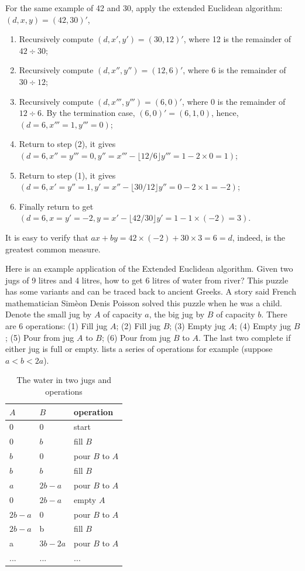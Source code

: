 \documentclass[b5paper]{article}
\begin{document}
For the same example of 42 and 30, apply the extended Euclidean algorithm: $(d, x, y) = (42, 30)'$,
\begin{enumerate}[{Step}(1)]
\item Recursively compute $(d, x', y') = (30, 12)'$, where 12 is the remainder of $42 \div 30$;
\item Recursively compute $(d, x'', y'') = (12, 6)'$, where 6 is the remainder of $30 \div 12$;
\item Recursively compute $(d, x''', y''') = (6, 0)'$, where 0 is the remainder of $12 \div 6$. By the termination case, $(6, 0)' = (6, 1, 0)$, hence, $(d = 6, x''' = 1, y''' = 0)$;
\item Return to step (2), it gives $(d = 6, x'' = y''' = 0, y'' = x''' - \lfloor 12/6 \rfloor y''' = 1 - 2 \times 0 = 1)$;
\item Return to step (1), it gives $(d = 6, x' = y'' = 1, y' = x'' - \lfloor 30/12 \rfloor y'' = 0 - 2 \times 1 = -2)$;
\item Finally return to get $(d = 6, x = y' = -2, y = x' - \lfloor 42/30 \rfloor y' = 1 - 1 \times (-2) = 3)$.
\end{enumerate}
It is easy to verify that $ax + by = 42 \times (-2) + 30 \times 3 = 6 = d$, indeed, is the greatest common measure.

Here is an example application of the Extended Euclidean algorithm. Given two jugs of 9 litres and 4 litres, how to get 6 litres of water from river? This puzzle has some variants and can be traced back to ancient Greeks. A story said French mathematician Sim\`{e}on Denis Poisson solved this puzzle when he was a child. Denote the small jug by $A$ of capacity $a$, the big jug by $B$ of capacity $b$. There are 6 operations: (1) Fill jug $A$; (2) Fill jug $B$; (3) Empty jug $A$; (4) Empty jug $B$; (5) Pour from jug $A$ to $B$; (6) Pour from jug $B$ to $A$. The last two complete if either jug is full or empty.  lists a series of operations for example (suppose $a < b < 2a$).

\begin{table}[htbp]
\centering
\begin{tabular}{|l|l|l|}
\hline
$A$ & $B$ & operation \\
\hline
0 & 0 & start \\
0 & $b$ & fill $B$ \\
$b$ & 0 & pour $B$ to $A$ \\
$b$ & $b$ & fill $B$ \\
$a$ & $2b - a$ & pour $B$ to $A$ \\
0 & $2b - a$ & empty $A$ \\
$2b - a$ & 0 & pour $B$ to $A$ \\
$2b - a$ & b & fill $B$ \\
a & $3b - 2a$ & pour $B$ to $A$ \\
... & ... & ... \\
\hline
\end{tabular}
\caption{The water in two jugs and operations}
\label{tab:jug-ops}
\end{table}
\end{document}
